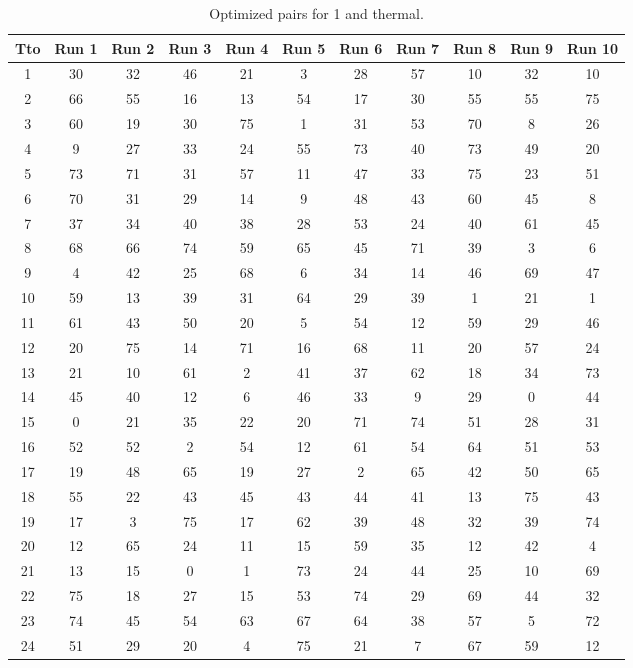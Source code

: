 \begin{table}
  \centering
  \scriptsize
  \caption{Optimized pairs for 1 and thermal.}
  \label{tab_pairs}
\begin{tabular}{c c c c c c c c c c c }
\hline
Tto & Run 1 & Run 2 & Run 3 & Run 4 & Run 5 & Run 6 & Run 7 & Run 8 & Run 9 & Run 10 \\
\hline
1 & 30 & 32 & 46 & 21 & 3 & 28 & 57 & 10 & 32 & 10 \\
2 & 66 & 55 & 16 & 13 & 54 & 17 & 30 & 55 & 55 & 75 \\
3 & 60 & 19 & 30 & 75 & 1 & 31 & 53 & 70 & 8 & 26 \\
4 & 9 & 27 & 33 & 24 & 55 & 73 & 40 & 73 & 49 & 20 \\
5 & 73 & 71 & 31 & 57 & 11 & 47 & 33 & 75 & 23 & 51 \\
6 & 70 & 31 & 29 & 14 & 9 & 48 & 43 & 60 & 45 & 8 \\
7 & 37 & 34 & 40 & 38 & 28 & 53 & 24 & 40 & 61 & 45 \\
8 & 68 & 66 & 74 & 59 & 65 & 45 & 71 & 39 & 3 & 6 \\
9 & 4 & 42 & 25 & 68 & 6 & 34 & 14 & 46 & 69 & 47 \\
10 & 59 & 13 & 39 & 31 & 64 & 29 & 39 & 1 & 21 & 1 \\
11 & 61 & 43 & 50 & 20 & 5 & 54 & 12 & 59 & 29 & 46 \\
12 & 20 & 75 & 14 & 71 & 16 & 68 & 11 & 20 & 57 & 24 \\
13 & 21 & 10 & 61 & 2 & 41 & 37 & 62 & 18 & 34 & 73 \\
14 & 45 & 40 & 12 & 6 & 46 & 33 & 9 & 29 & 0 & 44 \\
15 & 0 & 21 & 35 & 22 & 20 & 71 & 74 & 51 & 28 & 31 \\
16 & 52 & 52 & 2 & 54 & 12 & 61 & 54 & 64 & 51 & 53 \\
17 & 19 & 48 & 65 & 19 & 27 & 2 & 65 & 42 & 50 & 65 \\
18 & 55 & 22 & 43 & 45 & 43 & 44 & 41 & 13 & 75 & 43 \\
19 & 17 & 3 & 75 & 17 & 62 & 39 & 48 & 32 & 39 & 74 \\
20 & 12 & 65 & 24 & 11 & 15 & 59 & 35 & 12 & 42 & 4 \\
21 & 13 & 15 & 0 & 1 & 73 & 24 & 44 & 25 & 10 & 69 \\
22 & 75 & 18 & 27 & 15 & 53 & 74 & 29 & 69 & 44 & 32 \\
23 & 74 & 45 & 54 & 63 & 67 & 64 & 38 & 57 & 5 & 72 \\
24 & 51 & 29 & 20 & 4 & 75 & 21 & 7 & 67 & 59 & 12 \\

\end{tabular}
\end{table}
